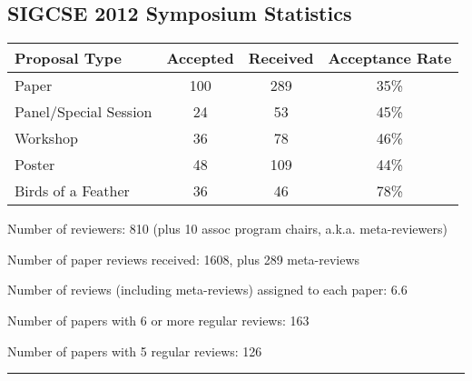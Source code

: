 \begin{center}
	\section*{SIGCSE 2012 Symposium Statistics} 
	\begin{tabular}{|l|c|c|c|}
	\hline
	Proposal Type & Accepted & Received & Acceptance Rate \\ \hline
	Paper & 100 & 289 & 35\% \\ \hline
	Panel/Special Session & 24 & 53 & 45\% \\ \hline
	Workshop & 36 & 78 & 46\% \\ \hline
	Poster & 48 & 109 & 44\% \\ \hline
	Birds of a Feather & 36 & 46 & 78\% \\ \hline
	\end{tabular}
\end{center}

Number of reviewers:  810 (plus 10 assoc program chairs, a.k.a. meta-reviewers)

Number of paper reviews received: 1608, plus 289 meta-reviews

Number of reviews (including meta-reviews) assigned to each paper: 6.6

Number of papers with 6 or more regular reviews: 163

Number of papers with 5 regular reviews: 126


\noindent\rule{5in}{0.02cm}

